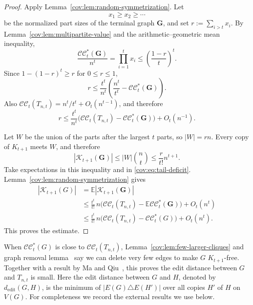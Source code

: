 \documentclass[11pt]{article}
\numberwithin{equation}{section}
\theoremstyle{remark}
\newcommand{\CC}{\mathcal{CC}}
\newcommand{\CCstar}{\mathcal{CC}^{*}}
\newcommand{\ed}{d_{\mathrm{edit}}}
\begin{document}
\begin{proof}
Apply Lemma~\ref{cov:lem:random-symmetrization}.  Let
\begin{equation*}
x_1\ge x_2\ge\cdots
\end{equation*}
be the normalized part sizes of the terminal graph \(\mathbf G\), and set \(r:=\sum_{i>t}x_i\).
By Lemma~\ref{cov:lem:multipartite-value} and the arithmetic--geometric mean inequality,
\begin{equation*}
\frac{\CCstar_t(\mathbf G)}{n^t}
 =\prod_{i=1}^t x_i
 \le \left(\frac{1-r}{t}\right)^t.
\end{equation*}
Since \(1-(1-r)^t\ge r\) for \(0\le r\le 1\),
\begin{equation*}
r\le
\frac{t^t}{n^t}\left(\frac{n^t}{t^t}-\CCstar_t(\mathbf G)\right).
\end{equation*}
Also \(\CC_t(T_{n,t})=n^t/t^t+O_t(n^{t-1})\), and therefore
\begin{equation}\label{cov:eq:tail-deficit}
r\le \frac{t^t}{n^t}\bigl(\CC_t(T_{n,t})-\CCstar_t(\mathbf G)\bigr)+O_t(n^{-1}).
\end{equation}

Let \(W\) be the union of the parts after the largest \(t\) parts, so
\(|W|=rn\).  Every copy of \(K_{t+1}\) meets \(W\), and therefore
\begin{equation*}
|\mathcal K_{t+1}(\mathbf G)|
 \le |W|\binom nt
 \le \frac{r}{t!}n^{t+1}.
\end{equation*}
Take expectations in this inequality and in \eqref{cov:eq:tail-deficit}. Lemma~\ref{cov:lem:random-symmetrization} gives
\begin{align*}
|\mathcal K_{t+1}(G)|
 &=\mathbb E |\mathcal K_{t+1}(\mathbf G)|\\
 &\le \frac{t^t}{t!}\,n\bigl(\CC_t(T_{n,t})-\mathbb E \CCstar_t(\mathbf G)\bigr)+O_t(n^t)\\
 &\le \frac{t^t}{t!}\,n\bigl(\CC_t(T_{n,t})-\CCstar_t(G)\bigr)+O_t(n^t).
\end{align*}
This proves the estimate.
\end{proof}

When \(\CCstar_t(G)\) is close to \(\CC_t(T_{n,t})\), Lemma~\ref{cov:lem:few-larger-cliques} and
graph removal lemma~\cite{Removal} say we can delete very few edges to make \(G\) \(K_{t+1}\)-free.
Together with a result by Ma and Qiu~\cite{MaQiu}, this proves the edit distance between \(G\) and
\(T_{n,t}\) is small. Here the edit distance between \(G\) and \(H\), denoted by \(\ed(G,H)\),
is the minimum of \(|E(G)\triangle E(H')|\) over all copies \(H'\) of \(H\) on \(V(G)\).
For completeness we record the external results we use below.
\end{document}
